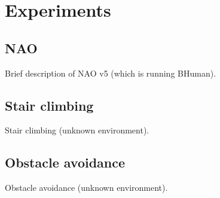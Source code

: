 \chapter{Experiments}
\section{NAO}
Brief description of NAO v5 (which is running BHuman).

\section{Stair climbing}
Stair climbing (unknown environment).

\section{Obstacle avoidance}
Obstacle avoidance (unknown environment).

